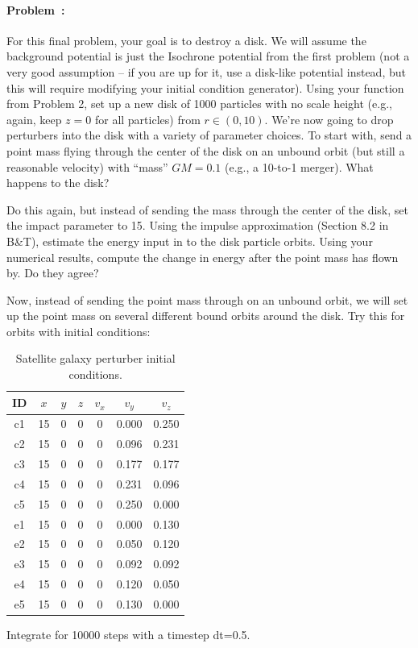 \documentclass[12pt,twoside]{article}
\newcommand{\problemname}{Problem}
\newcounter{problem}
\newenvironment{problem}{\paragraph{\problemname~\theproblem:}\refstepcounter{problem}}{}
\begin{document}
\begin{problem}

For this final problem, your goal is to destroy a disk. We will assume the background potential is just the Isochrone potential from the first problem (not a very good assumption -- if you are up for it, use a disk-like potential instead, but this will require modifying your initial condition generator). Using your function from Problem 2, set up a new disk of 1000 particles with no scale height (e.g., again, keep $z=0$ for all particles) from $r\in(0,10)$. We're now going to drop perturbers into the disk with a variety of parameter choices. To start with, send a point mass flying through the center of the disk on an unbound orbit (but still a reasonable velocity) with ``mass'' $GM = 0.1$ (e.g., a 10-to-1 merger). What happens to the disk? 

Do this again, but instead of sending the mass through the center of the disk, set the impact parameter to 15. Using the impulse approximation (Section 8.2 in B\&T), estimate the energy input in to the disk particle orbits. Using your numerical results, compute the change in energy after the point mass has flown by. Do they agree?

Now, instead of sending the point mass through on an unbound orbit, we will set up the point mass on several different bound orbits around the disk. Try this for orbits with initial conditions:
\begin{table}
\centering
\begin{tabular}{c c c c c c c}
ID & $x$ & $y$ & $z$ & $v_x$ & $v_y$ & $v_z$ \\
\hline
c1 & 15 & 0 & 0 & 0 & 0.000 & 0.250 \\ %
c2 & 15 & 0 & 0 & 0 & 0.096 & 0.231 \\
c3 & 15 & 0 & 0 & 0 & 0.177 & 0.177 \\ 
c4 & 15 & 0 & 0 & 0 & 0.231 & 0.096 \\
c5 & 15 & 0 & 0 & 0 & 0.250 & 0.000 \\
e1 & 15 & 0 & 0 & 0 & 0.000 & 0.130 \\ %
e2 & 15 & 0 & 0 & 0 & 0.050 & 0.120 \\ 
e3 & 15 & 0 & 0 & 0 & 0.092 & 0.092 \\ 
e4 & 15 & 0 & 0 & 0 & 0.120 & 0.050 \\ 
e5 & 15 & 0 & 0 & 0 & 0.130 & 0.000
\end{tabular}
\caption{Satellite galaxy perturber initial conditions.}
\end{table}
Integrate for 10000 steps with a timestep dt=0.5. 


\end{problem}
\end{document}
